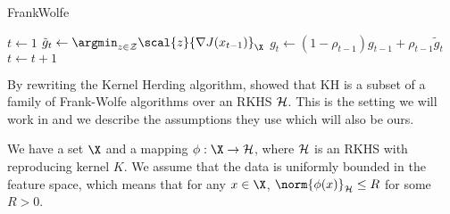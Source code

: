 \begin{algorithm}
  \caption{FrankWolfe}\label{alg:frank-wolfe}
  \begin{algorithmic}[1]  \State $t \gets 1$  \State $\tilde{g}_{t} \gets
\argmin_{z \in \mathcal{Z}} \scal{z}{\nabla J(x_{t-1})}_{\X}$ \State $g_{t}
\gets (1 - \rho_{t-1})g_{t-1} + \rho_{t-1}\tilde{g}_t$ \State $t \gets t + 1$
\EndWhile \EndProcedure
  \end{algorithmic}
\end{algorithm}

By rewriting the Kernel Herding algorithm,
\cite{bach12_equiv_between_herdin_condit_gradien_algor} showed that KH is a
subset of a family of Frank-Wolfe algorithms over an RKHS \(\mathcal{H}\). This is
the setting we will work in and we describe the assumptions they use which will
also be ours.

\begin{assumption}
\label{as:fw-kernel-herding} We have a set \(\X\) and a mapping \(\phi: \X \to
\rkhs{H}\), where \(\mathcal{H}\) is an RKHS with reproducing kernel \(K\). We
assume that the data is uniformly bounded in the feature space, which means that
for any \(x \in \X\), \(\norm{\phi(x)}_{\rkhs{H}} \leq R\) for some \(R > 0\).
\end{assumption}

